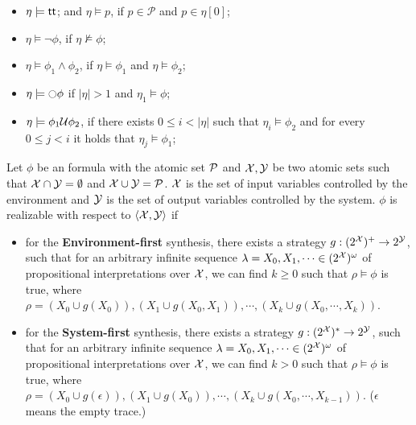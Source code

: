 \begin{itemize}%
  \item $\eta\models\true$; and $\eta\models p$, if $p\in\mathcal{P}$ and $p\in\eta[0]$;
  \item $\eta\models\neg\phi$, if $\eta\not\models\phi$;
  \item $\eta\models\phi_1\wedge\phi_2$,  if $\eta\models\phi_1$ and $\eta\models\phi_2$;
  \item $\eta\models \ocircle\phi$ if $|\eta|>1$ and $\eta_1\models\phi$;
  \item $\eta\models \phi_1 \U\phi_2$, if there exists $0\leq i < |\eta|$
  such that $\eta_i\models\phi_2$ and for every $0\leq j < i$ it holds that $\eta_j\models\phi_1$;
  \end{itemize}


\begin{definition}\label{def:synthesis}
Let $\phi$ be an \ltlf formula with the atomic set $\P$ and $\X,\Y$ be two atomic sets such that $\X\cap \Y=\emptyset$ and $\X\cup \Y= \P$. $\X$ is the set of input variables controlled by the environment and $\Y$ is the set of output variables controlled by the system. $\phi$ is realizable with respect to $\langle \X,\Y\rangle$ if
\begin{itemize}
\item for the \textbf{Environment-first} synthesis, there exists a strategy $g: (2^\X)^+ \to 2^\Y$, such that for an arbitrary infinite sequence $\lambda = X_0, X_1, \cdots \in (2^\X)^\omega$ of propositional interpretations over $\X$, we can find $k \geq 0$ such that $\rho\models\phi$ is true, where $\rho=(X_0\cup g(X_0)),(X_1\cup g(X_0,X_1)),\cdots,(X_k\cup g(X_0,\cdots,X_k))$.
\item for the \textbf{System-first} synthesis, there exists a strategy $g: (2^\X)^* \to 2^\Y$, such that for an arbitrary infinite sequence $\lambda = X_0, X_1, \cdots \in (2^\X)^\omega$ of propositional interpretations over $\X$, we can find $k > 0$ such that $\rho\models\phi$ is true, where $\rho=(X_0\cup g(\epsilon)),(X_1\cup g(X_0)),\cdots,(X_k\cup g(X_0,\cdots,X_{k-1}))$. ($\epsilon$ means the empty trace.) 
\end{itemize}
\end{definition}

